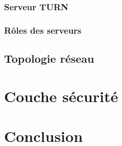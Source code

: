 \subsubsection{Serveur TURN}


\subsubsection{Rôles des serveurs}


\subsection{Topologie réseau}




\section{Couche sécurité}


\section{Conclusion}

